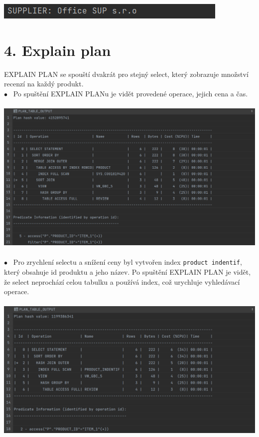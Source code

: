 \documentclass[12pt]{article}
\begin{document}
    \includegraphics[scale=0.825]{6.png}

\section*{4. Explain plan}
    EXPLAIN PLAN se spouští dvakrát pro stejný select, který zobrazuje množství recenzí na každý produkt.\\
    $\bullet$~ Po spuštění EXPLAIN PLANu je vidět provedené operace, jejich cena a čas.
    \\
    \\
    \includegraphics[scale=0.38]{7.png}
    \\
    \\
    $\bullet$~ Pro zrychlení selectu a snížení ceny byl vytvořen index \texttt{product indentif}, který obsahuje id produktu a jeho název. Po spuštění EXPLAIN PLAN je vidět, že select neprochází celou tabulku a používá index, což urychluje vyhledávací operace.
    \\
    \\
    \includegraphics[scale=0.405]{8.png}
\end{document}
